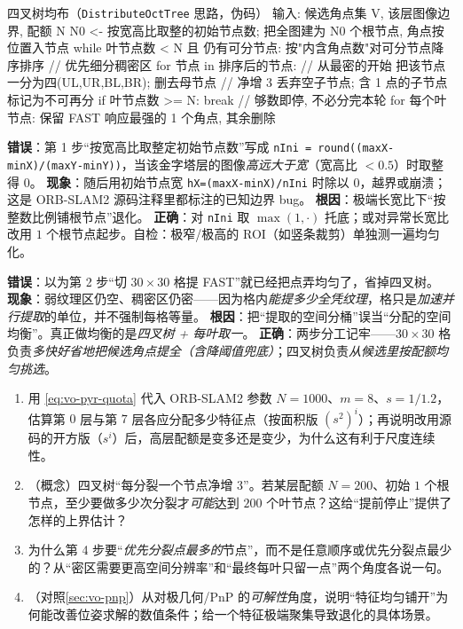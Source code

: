 \begin{codebox}[text]{四叉树均布（\texttt{DistributeOctTree} 思路，伪码）}
输入: 候选角点集 V, 该层图像边界, 配额 N
N0 <- 按宽高比取整的初始节点数;  把全图建为 N0 个根节点, 角点按位置入节点
while 叶节点数 < N 且 仍有可分节点:
    按"内含角点数"对可分节点降序排序            // 优先细分稠密区
    for 节点 in 排序后的节点:                    // 从最密的开始
        把该节点一分为四(UL,UR,BL,BR); 删去母节点  // 净增 3
        丢弃空子节点; 含 1 点的子节点标记为不可再分
        if 叶节点数 >= N: break                   // 够数即停, 不必分完本轮
for 每个叶节点:  保留 FAST 响应最强的 1 个角点, 其余删除
\end{codebox}

\begin{pitfall}
\textbf{错误}：第 1 步“按宽高比取整定初始节点数”写成 \texttt{nIni = round((maxX-minX)/(maxY-minY))}，当该金字塔层的图像\emph{高远大于宽}（宽高比 $<0.5$）时取整得 $0$。
\textbf{现象}：随后用初始节点宽 \texttt{hX=(maxX-minX)/nIni} 时除以 $0$，越界或崩溃；这是 ORB-SLAM2 源码注释里都标注的已知边界 bug。
\textbf{根因}：极端长宽比下“按整数比例铺根节点”退化。
\textbf{正确}：对 \texttt{nIni} 取 $\max(1,\cdot)$ 托底；或对异常长宽比改用 $1$ 个根节点起步。自检：极窄/极高的 ROI（如竖条裁剪）单独测一遍均匀化。
\end{pitfall}

\begin{pitfall}
\textbf{错误}：以为第 2 步“切 $30\times30$ 格提 FAST”就已经把点弄均匀了，省掉四叉树。
\textbf{现象}：弱纹理区仍空、稠密区仍密——因为格内\emph{能提多少全凭纹理}，格只是\emph{加速并行提取}的单位，并不强制每格等量。
\textbf{根因}：把“提取的空间分桶”误当“分配的空间均衡”。真正做均衡的是\emph{四叉树 + 每叶取一}。
\textbf{正确}：两步分工记牢——$30\times30$ 格负责\emph{多快好省地把候选角点提全（含降阈值兜底）}；四叉树负责\emph{从候选里按配额均匀挑选}。
\end{pitfall}

\begin{practice}
\begin{enumerate}
  \item 用 \cref{eq:vo-pyr-quota} 代入 ORB-SLAM2 参数 $N=1000$、$m=8$、$s=1/1.2$，估算第 $0$ 层与第 $7$ 层各应分配多少特征点（按面积版 $(s^2)^i$）；再说明改用源码的开方版（$s^i$）后，高层配额是变多还是变少，为什么这有利于尺度连续性。
  \item （概念）四叉树“每分裂一个节点净增 $3$”。若某层配额 $N=200$、初始 $1$ 个根节点，至少要做多少次分裂才\emph{可能}达到 $200$ 个叶节点？这给“提前停止”提供了怎样的上界估计？
  \item 为什么第 4 步要“\emph{优先分裂点最多的}节点”，而不是任意顺序或优先分裂点最少的？从“密区需要更高空间分辨率”和“最终每叶只留一点”两个角度各说一句。
  \item （对照\cref{sec:vo-pnp}）从对极几何/PnP 的\emph{可解性}角度，说明“特征均匀铺开”为何能改善位姿求解的数值条件；给一个特征极端聚集导致退化的具体场景。
\end{enumerate}
\end{practice}


